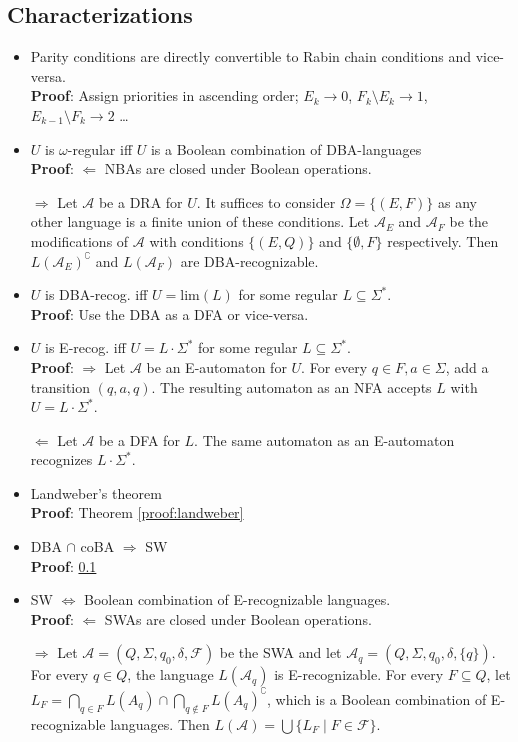 \documentclass{article}
\begin{document}
\subsection{Characterizations}
\begin{itemize}
	\item Parity conditions are directly convertible to Rabin chain conditions and vice-versa. \\
		\textbf{Proof}: Assign priorities in ascending order; $E_k \rightarrow 0$, $F_k \setminus E_k \rightarrow 1$, $E_{k-1} \setminus F_k \rightarrow 2$ \dots
	\item $U$ is $\omega$-regular iff $U$ is a Boolean combination of DBA-languages \\
		\textbf{Proof}: $\bm{\Leftarrow}$ NBAs are closed under Boolean operations.
		
		$\bm{\Rightarrow}$ Let $\mathcal{A}$ be a DRA for $U$. It suffices to consider $\Omega = \{(E, F)\}$ as any other language is a finite union of these conditions. Let $\mathcal{A}_E$ and $\mathcal{A}_F$ be the modifications of $\mathcal{A}$ with conditions $\{(E, Q)\}$ and $\{\emptyset, F\}$ respectively. Then $L(\mathcal{A}_E)^\complement$ and $L(\mathcal{A}_F)$ are DBA-recognizable.
	\item $U$ is DBA-recog. iff $U = \text{lim}(L)$ for some regular $L \subseteq \Sigma^*$. \\
		\textbf{Proof}: Use the DBA as a DFA or vice-versa.
	\item $U$ is E-recog. iff $U = L \cdot \Sigma^*$ for some regular $L \subseteq \Sigma^*$. \\
		\textbf{Proof}: $\bm{\Rightarrow}$ Let $\mathcal{A}$ be an E-automaton for $U$. For every $q \in F, a \in \Sigma$, add a transition $(q, a, q)$. The resulting automaton as an NFA accepts $L$ with $U = L \cdot \Sigma^*$.
		
		$\bm{\Leftarrow}$ Let $\mathcal{A}$ be a DFA for $L$. The same automaton as an E-automaton recognizes $L \cdot \Sigma^*$.
	\item Landweber's theorem \\
		\textbf{Proof}: Theorem \ref{proof:landweber}
	\item DBA $\cap$ coBA $\Rightarrow$ SW \\
		\textbf{Proof}: \ref{} %
	\item SW $\Leftrightarrow$ Boolean combination of E-recognizable languages. \\
		\textbf{Proof}: $\bm{\Leftarrow}$ SWAs are closed under Boolean operations.
		
		$\bm{\Rightarrow}$ Let $\mathcal{A} = (Q, \Sigma, q_0, \delta, \mathcal{F})$ be the SWA and let $\mathcal{A}_q = (Q, \Sigma, q_0, \delta, \{q\})$. For every $q \in Q$, the language $L(\mathcal{A}_q)$ is E-recognizable. For every $F \subseteq Q$, let $L_F = \bigcap\limits_{q \in F} L(A_q) \cap \bigcap\limits_{q \notin F} L(A_q)^\complement$, which is a Boolean combination of E-recognizable languages. Then $L(\mathcal{A}) = \bigcup \{ L_F \mid F \in \mathcal{F} \}$.
\end{itemize}
\end{document}
